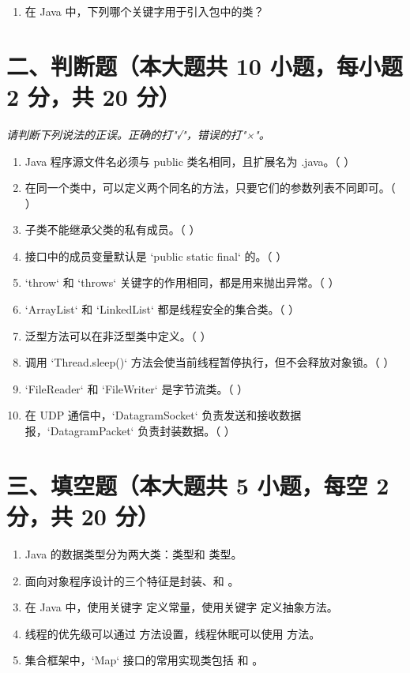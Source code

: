 \documentclass[a3paper, landscape, 11pt, twocolumn]{article}
\newcommand{\blank}{\underline{\hspace{3cm}}}
\begin{document}
\begin{enumerate}[label=\arabic*., itemsep=1em]
	\item 在 Java 中，下列哪个关键字用于引入包中的类？
\end{enumerate}

\section*{二、判断题（本大题共 10 小题，每小题 2 分，共 20 分）}
\textit{请判断下列说法的正误。正确的打"√"，错误的打"×"。}

\begin{enumerate}[label=\arabic*., itemsep=0.8em]
	\item Java 程序源文件名必须与 public 类名相同，且扩展名为 .java。（ \quad ）
	\item 在同一个类中，可以定义两个同名的方法，只要它们的参数列表不同即可。（ \quad ）
	\item 子类不能继承父类的私有成员。（ \quad ）
	\item 接口中的成员变量默认是 `public static final` 的。（ \quad ）
	\item `throw` 和 `throws` 关键字的作用相同，都是用来抛出异常。（ \quad ）
	\item `ArrayList` 和 `LinkedList` 都是线程安全的集合类。（ \quad ）
	\item 泛型方法可以在非泛型类中定义。（ \quad ）
	\item 调用 `Thread.sleep()` 方法会使当前线程暂停执行，但不会释放对象锁。（ \quad ）
	\item `FileReader` 和 `FileWriter` 是字节流类。（ \quad ）
	\item 在 UDP 通信中，`DatagramSocket` 负责发送和接收数据报，`DatagramPacket` 负责封装数据。（ \quad ）
\end{enumerate}

\section*{三、填空题（本大题共 5 小题，每空 2 分，共 20 分）}

\begin{enumerate}[label=\arabic*., itemsep=1em]
	\item Java 的数据类型分为两大类：\blank 类型和 \blank 类型。

	\item 面向对象程序设计的三个特征是封装、\blank 和 \blank。

	\item 在 Java 中，使用关键字 \blank 定义常量，使用关键字 \blank 定义抽象方法。

	\item 线程的优先级可以通过 \blank 方法设置，线程休眠可以使用 \blank 方法。

	\item 集合框架中，`Map` 接口的常用实现类包括 \blank 和 \blank。
\end{enumerate}
\end{document}
